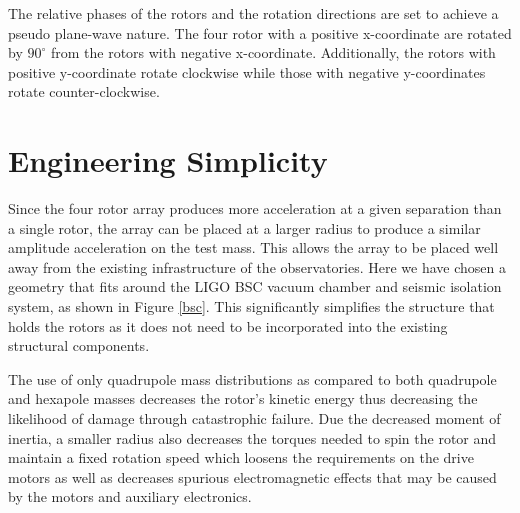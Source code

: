 \documentclass[superscriptaddress, twocolumn, prd]{revtex4-1}
\begin{document}
The relative phases of the rotors and the rotation directions are set to achieve a pseudo plane-wave nature. The four rotor with a positive x-coordinate are rotated by $90^\circ$ from the rotors with negative x-coordinate. Additionally, the rotors with positive y-coordinate rotate clockwise while those with negative y-coordinates rotate counter-clockwise. 

\section{Engineering Simplicity}

Since the four rotor array produces more acceleration at a given separation than a single rotor, the array can be placed at a larger radius to produce a similar amplitude acceleration on the test mass. This allows the array to be placed well away from the existing infrastructure of the observatories. Here we have chosen a geometry that fits around the LIGO BSC vacuum chamber and seismic isolation system, as shown in Figure \ref{bsc}. This significantly simplifies the structure that holds the rotors as it does not need to be incorporated into the existing structural components. 

The use of only quadrupole mass distributions as compared to both quadrupole and hexapole masses \cite{ncal} decreases the rotor's kinetic energy thus decreasing the likelihood of damage through catastrophic failure. Due the decreased moment of inertia, a smaller radius also decreases the torques needed to spin the rotor and maintain a fixed rotation speed which loosens the requirements on the drive motors as well as decreases spurious electromagnetic effects that may be caused by the motors and auxiliary electronics. 



\end{document}
